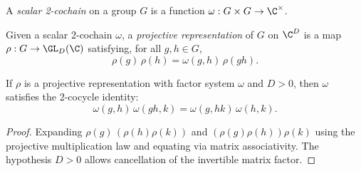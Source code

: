 \begin{definition}\label{def:scalar_cocycle}
    \leanok
    A \emph{scalar 2-cochain} on a group $G$ is a function
    $\omega : G \times G \to \C^{\times}$.
\end{definition}

\begin{definition}\label{def:projective_rep}
    \leanok
    Given a scalar 2-cochain $\omega$, a \emph{projective representation}
    of $G$ on $\C^D$ is a map $\rho : G \to \GL_{D}(\C)$ satisfying, for all
    $g,h \in G$,
    \[
        \rho(g)\, \rho(h) = \omega(g,h)\, \rho(gh).
    \]
\end{definition}

\begin{lemma}%
    \label{lem:cocycle_of_assoc}
    \leanok
    If $\rho$ is a projective representation with factor system $\omega$
    and $D > 0$, then $\omega$ satisfies the 2-cocycle identity:
    \[
        \omega(g, h)\, \omega(gh, k)
        = \omega(g, hk)\, \omega(h, k).
    \]
\end{lemma}

\begin{proof}\leanok{}
    Expanding $\rho(g)\,(\rho(h) \rho(k))$ and
    $(\rho(g) \rho(h)) \rho(k)$ using the projective
    multiplication law and equating via matrix associativity.
    The hypothesis $D > 0$ allows cancellation of the
    invertible matrix factor.
\end{proof}

